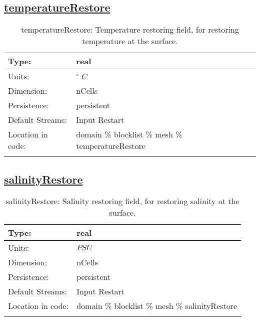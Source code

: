 \subsection[temperatureRestore]{\hyperref[sec:var_tab_mesh]{temperatureRestore}}
\label{subsec:var_sec_mesh_temperatureRestore}
\begin{center}
\begin{longtable}{| p{2.0in} | p{4.0in} |}
        \hline 
        Type: & real \\
        \hline 
        Units: & $^\circ$ $C$ \\
        \hline 
        Dimension: & nCells \\
        \hline 
        Persistence: & persistent \\
        \hline 
		 Default Streams: & Input Restart  \\
        \hline 
		 Location in code: & domain \% blocklist \% mesh \% temperatureRestore \\
		 \hline 
    \caption{temperatureRestore: Temperature restoring field, for restoring temperature at the surface.}
\end{longtable}
\end{center}
\subsection[salinityRestore]{\hyperref[sec:var_tab_mesh]{salinityRestore}}
\label{subsec:var_sec_mesh_salinityRestore}
\begin{center}
\begin{longtable}{| p{2.0in} | p{4.0in} |}
        \hline 
        Type: & real \\
        \hline 
        Units: & $PSU$ \\
        \hline 
        Dimension: & nCells \\
        \hline 
        Persistence: & persistent \\
        \hline 
		 Default Streams: & Input Restart  \\
        \hline 
		 Location in code: & domain \% blocklist \% mesh \% salinityRestore \\
		 \hline 
    \caption{salinityRestore: Salinity restoring field, for restoring salinity at the surface.}
\end{longtable}
\end{center}
